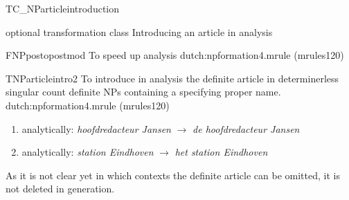 \begin{mruleclass}{TC\_NParticleintroduction}
\begin{classdescr}
\kind optional transformation class
\classtask Introducing an article in  analysis
\classremarks
\nofilters

\begin{speedrules}
\begin{members}
\begin{member}
 FNPpostopostmod
 To speed up analysis
\file dutch:npformation4.mrule (mrules120)
\end{member}
\end{members}
\end{speedrules}

\noplannedrules
\norulesnotince
\begin{comments}
\end{comments}
\end{classdescr}


\begin{members}
\begin{member}
 TNParticleintro2
To introduce in analysis 
the definite article in determinerless singular count definite NPs 
containing a specifying proper name. 
\file dutch:npformation4.mrule (mrules120)
\semantics \nosemantics
\example
\begin{enumerate}
  \item 
analytically: {\em hoofdredacteur Jansen}
$\rightarrow$ 
{\em de hoofdredacteur Jansen}

  \item 
analytically: 
{\em  station Eindhoven}
$\rightarrow$ 
{\em  het station Eindhoven}

\end{enumerate}
\remarks As it is not clear yet in which contexts
the definite
article can be omitted, it is not deleted in generation.
\end{member}
\end{members}
\end{mruleclass}






